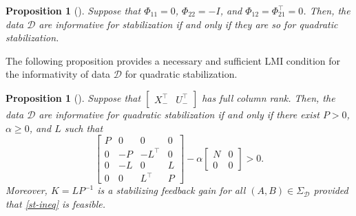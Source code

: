 \documentclass[9pt,shortpaper,twoside,web]{ieeecolor}
\DeclareMathOperator{\rank}{rank}
\newcommand{\bbma}{\begin{bmatrix}}
\newcommand{\ebma}{\end{bmatrix}}
\newcommand{\mac}[1]{\mathcal{#1}}
\newtheorem{proposition}[theorem]{Proposition}
\begin{document}
\begin{proposition}[{\cite[Thm. 1]{van2022data}}]
Suppose that $\Phi_{11}=0$, $\Phi_{22}=-I$, and $\Phi_{12}=\Phi_{21}^\top=0$. Then, the data $\mathcal{D}$ are informative for stabilization \emph{if and only if} they are so for quadratic stabilization. 
\end{proposition}

The following proposition provides a necessary and sufficient LMI condition for the informativity of data $\mac{D}$ for quadratic stabilization. 

\begin{proposition}[{\cite[Thm. 5.1(b)]{HenkQMI2023}}]
\label{prop:DDC}
 Suppose that $\bbma X_-^\top & U_-^\top \ebma$ has full column rank. Then, the data $\mac{D}$ are informative for quadratic stabilization \emph{if and only if} there exist $P>0$, $\alpha\geq 0$, and $L$ such that
\begin{equation}
\bbma P & 0 & 0 & 0 \\ 0 & -P & - L^\top & 0 \\ 0 & - L & 0 &  L \\ 0 & 0 &  L^\top & P \ebma
-\alpha \bbma N & 0\\ 0 & 0 \ebma > 0.
\label{st-ineq}
\end{equation}
Moreover, $K=LP^{-1}$ is a stabilizing feedback gain for all \mbox{$(A,B) \in \Sigma_\mathcal{D}$} provided that \eqref{st-ineq} is feasible.
\end{proposition}


\end{document}
